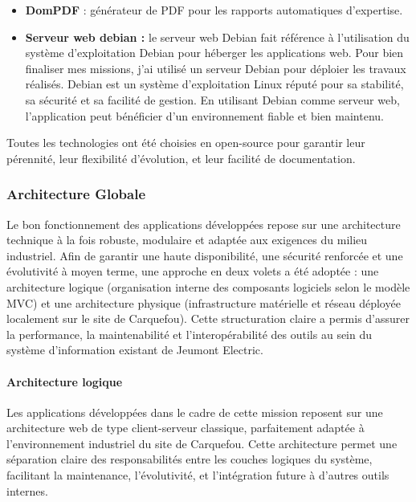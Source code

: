 \documentclass[11pt,a4paper]{article}
\begin{document}
\begin{itemize}
\item \textbf{DomPDF} : générateur de PDF pour les rapports automatiques d’expertise.

\item \textbf{Serveur web debian : }
le serveur web Debian fait référence à l'utilisation du système d'exploitation Debian pour héberger les applications web. Pour bien finaliser mes missions, j’ai utilisé un serveur Debian pour déploier les travaux réalisés.  Debian est un système d'exploitation Linux réputé pour sa stabilité, sa sécurité et sa facilité de gestion. En utilisant Debian comme serveur web, l'application peut bénéficier d'un environnement fiable et bien maintenu.
\end{itemize}

Toutes les technologies ont été choisies en open-source pour garantir leur pérennité, leur flexibilité d’évolution, et leur facilité de documentation.

\subsubsection{Architecture Globale}

Le bon fonctionnement des applications développées repose sur une architecture technique à la fois robuste, modulaire et adaptée aux exigences du milieu industriel. Afin de garantir une haute disponibilité, une sécurité renforcée et une évolutivité à moyen terme, une approche en deux volets a été adoptée : une architecture logique (organisation interne des composants logiciels selon le modèle MVC) et une architecture physique (infrastructure matérielle et réseau déployée localement sur le site de Carquefou). Cette structuration claire a permis d’assurer la performance, la maintenabilité et l’interopérabilité des outils au sein du système d’information existant de Jeumont Electric.

\paragraph{Architecture logique}
Les applications développées dans le cadre de cette mission reposent sur une architecture web de type client-serveur classique, parfaitement adaptée à l’environnement industriel du site de Carquefou. Cette architecture permet une séparation claire des responsabilités entre les couches logiques du système, facilitant la maintenance, l’évolutivité, et l’intégration future à d’autres outils internes.
\end{document}
